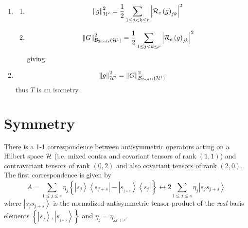 \begin{theorem}
\begin{enumerate}
\item 
\begin{enumerate}
\item 
\begin{equation}
\left\Vert g\right\Vert _{{\cal H}^{2}}^{2}=\frac{1}{2}\sum_{1\leq j<k\leq
r}\left\vert {\cal R}_{e}\left( g\right) _{jk}\right\vert ^{2}
\end{equation}

\item 
\begin{equation}
\left\Vert G\right\Vert _{{\cal B}_{2anti}\left( {\cal H}^{1}\right) }^{2}=%
\frac{1}{2}\sum_{1\leq j<k\leq r}\left\vert {\cal R}_{e}\left( g\right)
_{jk}\right\vert ^{2}
\end{equation}%
giving
\end{enumerate}

\item 
\begin{equation}
\left\Vert g\right\Vert _{{\cal H}^{2}}^{2}=\left\Vert G\right\Vert _{{\cal B%
}_{2anti}\left( {\cal H}^{1}\right) }^{2}
\end{equation}%
thus $T$ is an isometry.
\end{enumerate}
\end{theorem}

\section{Symmetry}

There is a 1-1 correspondence between antisymmetric operators acting on a
Hilbert space ${\cal H}$ (i.e. mixed contra and covariant tensors of rank $%
\left( 1,1\right) $) and contravariant tensors of rank $\left( 0,2\right) $
and also covariant tensors of rank $\left( 2,0\right) $. The first
correspondence is given by 
\begin{equation}
A=\sum_{1\leq j\leq s}\eta _{j}\left\{ \left\vert \stackrel{}{s_{j}}%
\right\rangle \left\langle \stackrel{}{s_{j+s}}\right\vert -\left\vert
s_{_{j+s}}\right\rangle \left\langle \stackrel{}{s_{j}}\right\vert \right\}
\leftrightarrow 2\sum_{1\leq j\leq s}\eta _{j}\left\vert
s_{j}s_{j+s}\right\rangle  \label{contra}
\end{equation}%
where $\left\vert s_{j}s_{j+s}\right\rangle $ is the normalized
antisymmetric tensor product of the {\em real }basis elements $\left\{
\left\vert s_{j}\right\rangle ,\left\vert s_{_{j+s}}\right\rangle \right\} $
and $\eta _{j}=\eta _{jj+s}$.

